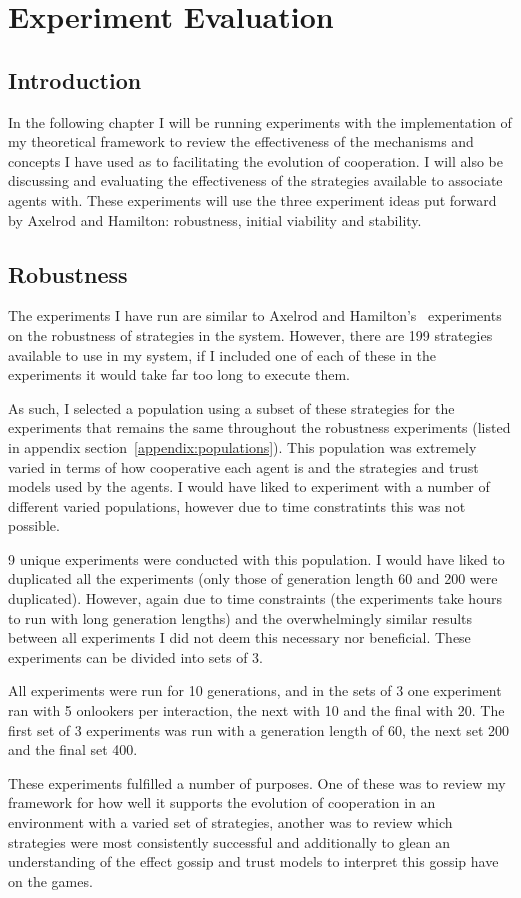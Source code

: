 \documentclass[]{final_report}
\begin{document}
\chapter{Experiment Evaluation}
\label{chap:exp}
\section{Introduction}
In the following chapter I will be running experiments with the implementation of my theoretical framework to review the effectiveness of the mechanisms and concepts I have used as to facilitating the evolution of cooperation. I will also be discussing and evaluating the effectiveness of the strategies available to associate agents with. These experiments will use the three experiment ideas put forward by Axelrod and Hamilton: robustness, initial viability and stability.

\section{Robustness}
The experiments I have run are similar to Axelrod and Hamilton's~\cite{evolution_of_cooperation} experiments on the robustness of strategies in the system. However, there are 199 strategies available to use in my system, if I included one of each of these in the experiments it would take far too long to execute them.\par 
As such, I selected a population using a subset of these strategies for the experiments that remains the same throughout the robustness experiments (listed in appendix section~\ref{appendix:populations}). This population was extremely varied in terms of how cooperative each agent is and the strategies and trust models used by the agents. I would have liked to experiment with a number of different varied populations, however due to time constratints this was not possible.\par 
9 unique experiments were conducted with this population. I would have liked to duplicated all the experiments (only those of generation length 60 and 200 were duplicated). However, again due to time constraints (the experiments take hours to run with long generation lengths) and the overwhelmingly similar results between all experiments I did not deem this necessary nor beneficial. These experiments can be divided into sets of 3.\par 
All experiments were run for 10 generations, and in the sets of 3 one experiment ran with 5 onlookers per interaction, the next with 10 and the final with 20. The first set of 3 experiments was run with a generation length of 60, the next set 200 and the final set 400.\par
These experiments fulfilled a number of purposes. One of these was to review my framework for how well it supports the evolution of cooperation in an environment with a varied set of strategies, another was to review which strategies were most consistently successful and additionally to glean an understanding of the effect gossip and trust models to interpret this gossip have on the games.
\end{document}
